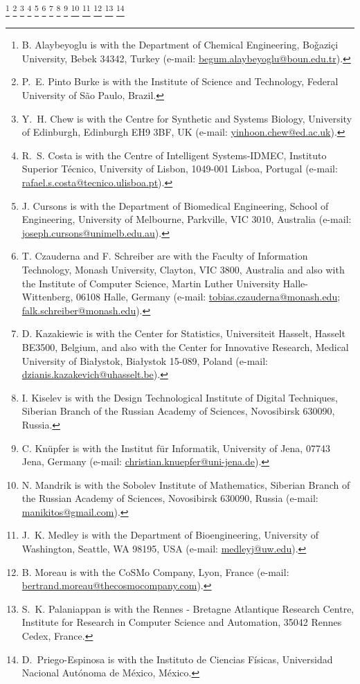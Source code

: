 \documentclass[journal,transmag]{IEEEtran}
\newcommand{\email}[1]{\href{mailto:#1}{#1}}
\begin{document}
{    \thanks{B. Alaybeyoglu is with the Department of Chemical Engineering, Bo\v{g}azi\c{c}i University, Bebek 34342, Turkey (e-mail: \email{begum.alaybeyoglu@boun.edu.tr}).}
    \thanks{P.~E. Pinto Burke is with the Institute of Science and Technology, Federal University of S\~{a}o Paulo, Brazil.}
    \thanks{Y.~H. Chew is with the Centre for Synthetic and Systems Biology, University of Edinburgh, Edinburgh EH9 3BF, UK (e-mail: \email{yinhoon.chew@ed.ac.uk}).}
    \thanks{R.~S. Costa is with the Centre of Intelligent Systems-IDMEC, Instituto Superior T{\'e}cnico, University of Lisbon, 1049-001 Lisboa, Portugal (e-mail: \email{rafael.s.costa@tecnico.ulisboa.pt}).}
    \thanks{J. Cursons is with the Department of Biomedical Engineering, School of Engineering, University of Melbourne, Parkville, VIC 3010, Australia (e-mail: \email{joseph.cursons@unimelb.edu.au}).}
    \thanks{T. Czauderna and F. Schreiber are with the Faculty of Information Technology, Monash University, Clayton, VIC 3800, Australia and also with the Institute of Computer Science, Martin Luther University Halle-Wittenberg, 06108 Halle, Germany (e-mail: \email{tobias.czauderna@monash.edu}; \email{falk.schreiber@monash.edu}).}
    \thanks{D. Kazakiewic is with the Center for Statistics, Universiteit Hasselt, Hasselt BE3500, Belgium, and also with the Center for Innovative Research, Medical University of Bia\l{}ystok, Bia\l{}ystok 15-089, Poland (e-mail: \email{dzianis.kazakevich@uhasselt.be}).}
    \thanks{I. Kiselev is with the Design Technological Institute of Digital Techniques, Siberian Branch of the Russian Academy of Sciences, Novosibirsk 630090, Russia.}
    \thanks{C. Kn\"{u}pfer is with the Institut f\"ur Informatik, University of Jena, 07743 Jena, Germany (e-mail: \email{christian.knuepfer@uni-jena.de}).}
    \thanks{N. Mandrik is with the Sobolev Institute of Mathematics, Siberian Branch of the Russian Academy of Sciences, Novosibirsk 630090, Russia (e-mail: \email{manikitos@gmail.com}).}
    \thanks{J.~K. Medley is with the Department of Bioengineering, University of Washington, Seattle, WA 98195, USA (e-mail: \email{medleyj@uw.edu}).}
    \thanks{B. Moreau is with the CoSMo Company, Lyon, France (e-mail: \email{bertrand.moreau@thecosmocompany.com}).}
    \thanks{S.~K. Palaniappan is with the Rennes - Bretagne Atlantique Research Centre, Institute for Research in Computer Science and Automation, 35042 Rennes Cedex, France.}
    \thanks{D.~Priego-Espinosa is with the Instituto de Ciencias F{\'i}sicas, Universidad Nacional Aut{\'o}noma de M{\'e}xico, M{\'e}xico.}
}
\end{document}
